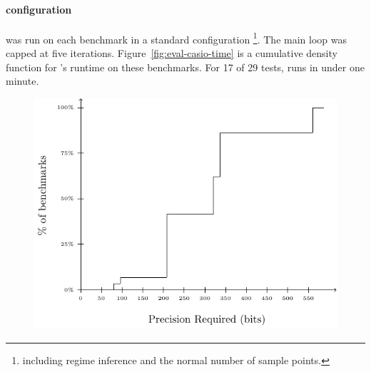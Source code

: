 \documentclass[paper.tex]{subfiles}
\begin{document}
\paragraph{\casio configuration}
\casio was run on each benchmark in a standard configuration%
  \footnote{including regime inference and
    the normal number of sample points.}.
The main loop was capped at five iterations.
Figure~\ref{fig:eval-casio-time} is a cumulative density function
  for \casio's runtime on these benchmarks.
For 17 of 29 tests, \casio runs in under one minute.

\begin{figure}
\label{fig:eval-mpfr-bits}
\includegraphics[width=0.9\columnwidth]{fig/eval-mpfr-bits.pdf}
\caption{}
\end{figure}
\end{document}
